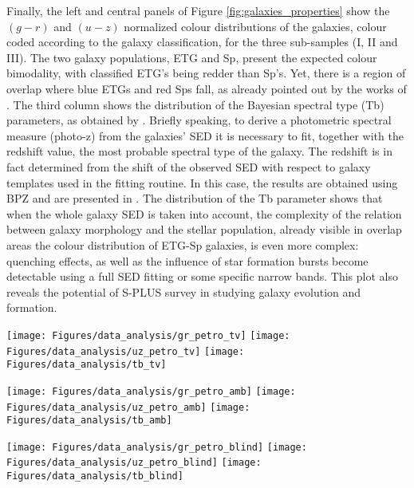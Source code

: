 \documentclass[fleqn,usenatbib]{mnras}
\begin{document}
Finally, the left and central panels of Figure \ref{fig:galaxies_properties} show the $(g-r)$ and $(u-z)$ normalized colour distributions of the galaxies, colour coded according to the galaxy classification, for the three sub-samples (I, II and III). The two galaxy populations, ETG and Sp, present the expected colour bimodality, with classified ETG's being redder than Sp's. 
Yet, there is a region of overlap where blue ETGs and red Sps fall, as already pointed out by the works of \citet{bamford2009galaxy, Schawinsky2009, Masters2010}. 
The third column shows the distribution of the Bayesian spectral type (Tb) parameters, as obtained by \citet{Molino2020}. Briefly speaking, to derive a photometric spectral measure (photo-z) from the galaxies' SED it is necessary to fit, together with the redshift value, the most probable spectral type of the galaxy. The redshift is in fact determined from the shift of the observed SED with respect to galaxy templates used in the fitting routine. In this case, the results are obtained using BPZ \citep{Ciccio} and are presented in \citet{Molino2020}.
The distribution of the Tb parameter shows that when the whole galaxy SED  is taken into account, the complexity of the relation between galaxy morphology and the stellar population, already visible in overlap areas the colour distribution of ETG-Sp galaxies, is even more complex: quenching effects, as well as the influence of star formation bursts become detectable using a full SED fitting or some specific narrow bands.
This plot also reveals the potential of S-PLUS survey in studying galaxy evolution and formation.








\begin{figure*}
	\centering
	\texttt{[image: Figures/data\_analysis/gr\_petro\_tv]}
	\texttt{[image: Figures/data\_analysis/uz\_petro\_tv]}
	\texttt{[image: Figures/data\_analysis/tb\_tv]}

	\texttt{[image: Figures/data\_analysis/gr\_petro\_amb]}
	\texttt{[image: Figures/data\_analysis/uz\_petro\_amb]}
	\texttt{[image: Figures/data\_analysis/tb\_amb]}

	\texttt{[image: Figures/data\_analysis/gr\_petro\_blind]}
	\texttt{[image: Figures/data\_analysis/uz\_petro\_blind]}
	\texttt{[image: Figures/data\_analysis/tb\_blind]}
	\caption{
	Histogram of the $g-r$ (left), $u$JAVA$-z$ (centre), and bayesian spectral type (tb; right) parameters for the ETG (red) and Sp (blue) galaxies in the training-validation set (I) ({top}), the ambiguous set (II) ({middle}) and the blind set (III) ({bottom}).
	}
	\label{fig:galaxies_properties}
\end{figure*}
\end{document}
